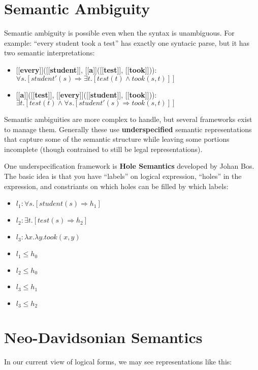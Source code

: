 \documentclass[11pt,letterpaper]{article}
\newcommand{\sem}[1]{\mbox{[\hspace{-1.25px}[{\bf #1}]\hspace{-1.5px}]}}
\begin{document}
\section{Semantic Ambiguity}

Semantic ambiguity is possible even when the syntax is unambiguous.  For example: ``every student took a test'' has exactly one syntacic parse, but it has two semantic interpretations:

\begin{itemize}
  \item[] \sem{every}(\sem{student}, \sem{a}(\sem{test}, \sem{took})): 
  $\forall s.[\textit{student}'(s) \Rightarrow \exists t.[test(t) \land took(s,t)]]$
  \item[] \sem{a}(\sem{test}, \sem{every}(\sem{student}, \sem{took})): 
  $\exists t.[test(t) \land \forall s.[\textit{student}'(s) \Rightarrow took(s,t)]]$
\end{itemize}

Semantic ambiguities are more complex to handle, but several frameworks exist to manage them.  Generally these use \textbf{underspecified} semantic representations that capture some of the semantic structure while leaving some portions incomplete (though contrained to still be legal representations).

One underspecification framework is \textbf{Hole Semantics} developed by Johan Bos.  The basic idea is that you have ``labels'' on logical expression, ``holes'' in the expression, and constriants on which holes can be filled by which labels:

\begin{itemize}
  \item[] $l_1: \forall s.[student(s) \Rightarrow h_1]$
  \item[] $l_2: \exists t.[test(s) \Rightarrow h_2]$
  \item[] $l_3: \lambda x.\lambda y.took(x,y)$
  \item[] $l_1 \leq h_0$
  \item[] $l_2 \leq h_0$
  \item[] $l_3 \leq h_1$
  \item[] $l_3 \leq h_2$
\end{itemize}


\section{Neo-Davidsonian Semantics}

In our current view of logical forms, we may see representations like this:
\end{document}
